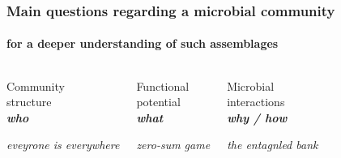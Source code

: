 \documentclass{beamer}
\begin{document}
   \begin{frame}
      \frametitle{Main questions regarding a microbial community}
      \framesubtitle{for a deeper understanding of such assemblages}
      \begin{singlespace}


         \begin{columns}[onlytextwidth]
            

               \begin{center}

                  Community \\ structure   \\ \textbf{\textit{who}}  

                  \hrulefill

                  \scriptsize \textit{eveyrone is everywhere}

               \end{center}



               \begin{center}

                  Functional \\ potential \\ \textbf{\textit{what}}

                  \hrulefill

                  \scriptsize \textit{zero-sum game}

               \end{center}


               \begin{center}

                  Microbial \\ interactions \\ \textbf{\textit{why / how}}

                  \hrulefill

                  \scriptsize \textit{the entagnled bank}

               \end{center}
      

         \end{columns}

      \end{singlespace}

   \end{frame}
\end{document}
